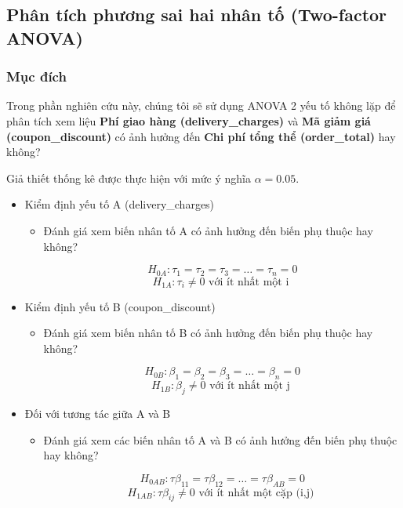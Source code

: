 
\subsection{Phân tích phương sai hai nhân tố (Two-factor ANOVA)}
\subsubsection{Mục đích}
Trong phần nghiên cứu này, chúng tôi sẽ sử dụng ANOVA 2 yếu tố không lặp để phân tích xem liệu \textbf{Phí giao hàng (delivery\_charges)} và \textbf{Mã giảm giá  (coupon\_discount)} có ảnh hưởng đến \textbf{Chi phí tổng thể (order\_total)} hay không?

Giả thiết thống kê được thực hiện với mức ý nghĩa $\alpha = 0.05$.


\begin{itemize}
    
    \item Kiểm định yếu tố A (delivery\_charges)
    \begin{itemize}
        \item Đánh giá xem biến nhân tố A có ảnh hưởng đến biến phụ thuộc hay không?
        
        \[
            H_{0A}: \tau_{1} = \tau_{2} = \tau_{3} = \dots = \tau_{n} = 0
            \]
            \[
            H_{1A}: \tau_{i} \neq  0 \text{ với ít nhất một i }
            \]
    \end{itemize}
    
    \item Kiểm định yếu tố B (coupon\_discount)
    \begin{itemize}
        \item Đánh giá xem biến nhân tố B có ảnh hưởng đến biến phụ thuộc hay không?
        
        \[
            H_{0B}: \beta_{1} = \beta_{2} = \beta_{3} = \dots = \beta_{n} = 0
            \]
            \[
            H_{1B}: \beta_{j} \neq  0 \text{ với ít nhất một j }
            \]
    \end{itemize}
    \item Đối với tương tác giữa A và B  
    \begin{itemize}
        \item Đánh giá xem các biến nhân tố A và B có ảnh hưởng đến biến phụ thuộc hay không?
        
        \[
            H_{0AB}: \tau\beta_{11} = \tau\beta_{12}  = \dots = \tau\beta_{AB} = 0 
            \]
            \[
            H_{1AB}: \tau\beta_{ij} \neq  0 \text{ với ít nhất một cặp (i,j) }
            \]
    \end{itemize}
\end{itemize}
